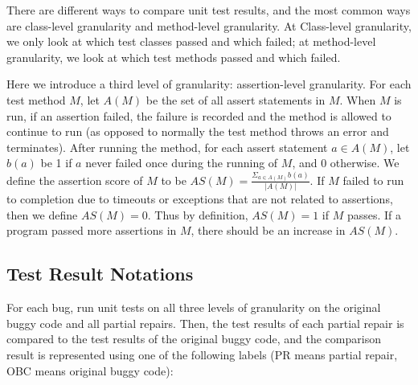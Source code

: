 \documentclass[sigconf, timestamp-false, anonymous=true]{acmart}
\begin{document}
There are different ways to compare unit test results, and the most common ways are class-level granularity and method-level granularity. At Class-level granularity, we only look at which test classes passed and which failed; at method-level granularity, we look at which test methods passed and which failed.

Here we introduce a third level of granularity: assertion-level granularity. For each test method $M$, let $A(M)$ be the set of all assert statements in $M$. When $M$ is run, if an assertion failed, the failure is recorded and the method is allowed to continue to run (as opposed to normally the test method throws an error and terminates). After running the method, for each assert statement $a\in A(M)$, let $b(a)$ be 1 if $a$ never failed once during the running of $M$, and 0 otherwise. We define the assertion score of $M$ to be $AS(M)=\frac{\Sigma_{a\in A(M)}b(a)}{|A(M)|}$. If $M$ failed to run to completion due to timeouts or exceptions that are not related to assertions, then we define $AS(M)=0$. Thus by definition, $AS(M)=1$ if $M$ passes. If a program passed more assertions in $M$, there should be an increase in $AS(M)$.

\subsection{Test Result Notations}

For each bug, run unit tests on all three levels of granularity on the original buggy code and all partial repairs. Then, the test results of each partial repair is compared to the test results of the original buggy code, and the comparison result is represented using one of the following labels (PR means partial repair, OBC means original buggy code):
\end{document}
